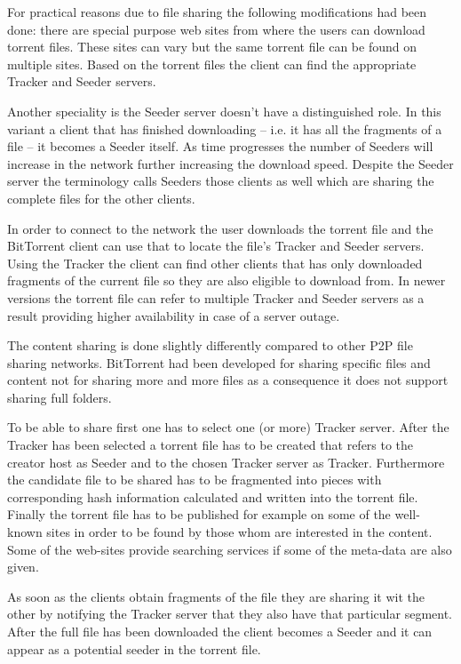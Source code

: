 \documentclass[a4paper]{article}
\begin{document}
For practical reasons due to file sharing the following modifications had been done: there are special purpose web
sites from where the users can download torrent files. These sites can vary but the same torrent file can be found on
multiple sites. Based on the torrent files the client can find the appropriate Tracker and Seeder servers.

Another speciality is the Seeder server doesn't have a distinguished role. In this variant a client that has finished
downloading -- i.e. it has all the fragments of a file -- it becomes a Seeder itself. As time progresses the number of
Seeders will increase in the network further increasing the download speed. Despite the Seeder server the terminology
calls Seeders those clients as well which are sharing the complete files for the other clients.

In order to connect to the network the user downloads the torrent file and the BitTorrent client can use that to locate
the file's Tracker and Seeder servers. Using the Tracker the client can find other clients that has only downloaded
fragments of the current file so they are also eligible to download from. In newer versions the torrent file can refer
to multiple Tracker and Seeder servers as a result providing higher availability in case of a server outage.

The content sharing is done slightly differently compared to other P2P file sharing networks. BitTorrent had been
developed for sharing specific files and content not for sharing more and more files as a consequence it does not
support sharing full folders.

To be able to share first one has to select one (or more) Tracker server. After the Tracker has been selected a torrent
file has to be created that refers to the creator host as Seeder and to the chosen Tracker server as Tracker.
Furthermore the candidate file to be shared has to be fragmented into pieces with corresponding hash information
calculated and written into the torrent file. Finally the torrent file has to be published for example on some of the
well-known sites in order to be found by those whom are interested in the content. Some of the web-sites provide
searching services if some of the meta-data are also given.

As soon as the clients obtain fragments of the file they are sharing it wit the other by notifying the Tracker server
that they also have that particular segment. After the full file has been downloaded the client becomes a Seeder and it
can appear as a potential seeder in the torrent file.
\end{document}
